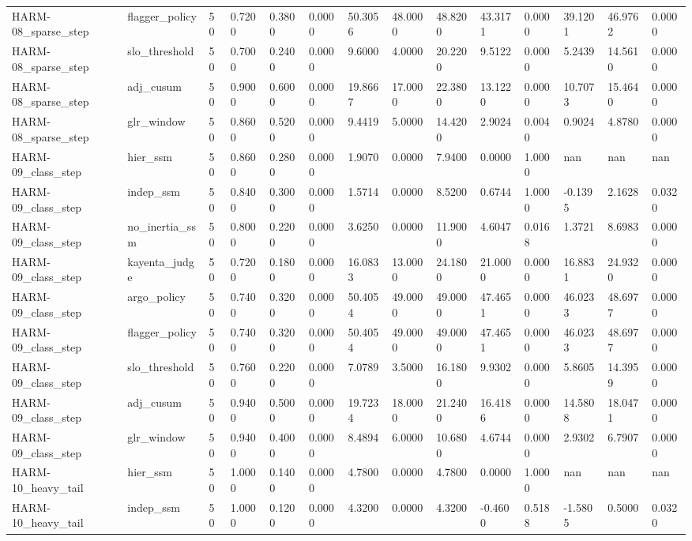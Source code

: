 \begin{table}[htbp]
\begin{tabular}{llllllllllllll}
HARM-08\_sparse\_step & flagger\_policy & 50 & 0.7200 & 0.3800 & 0.0000 & 50.3056 & 48.0000 & 48.8200 & 43.3171 & 0.0000 & 39.1201 & 46.9762 & 0.0000 \\
HARM-08\_sparse\_step & slo\_threshold & 50 & 0.7000 & 0.2400 & 0.0000 & 9.6000 & 4.0000 & 20.2200 & 9.5122 & 0.0000 & 5.2439 & 14.5610 & 0.0000 \\
HARM-08\_sparse\_step & adj\_cusum & 50 & 0.9000 & 0.6000 & 0.0000 & 19.8667 & 17.0000 & 22.3800 & 13.1220 & 0.0000 & 10.7073 & 15.4640 & 0.0000 \\
HARM-08\_sparse\_step & glr\_window & 50 & 0.8600 & 0.5200 & 0.0000 & 9.4419 & 5.0000 & 14.4200 & 2.9024 & 0.0040 & 0.9024 & 4.8780 & 0.0000 \\
HARM-09\_class\_step & hier\_ssm & 50 & 0.8600 & 0.2800 & 0.0000 & 1.9070 & 0.0000 & 7.9400 & 0.0000 & 1.0000 & nan & nan & nan \\
HARM-09\_class\_step & indep\_ssm & 50 & 0.8400 & 0.3000 & 0.0000 & 1.5714 & 0.0000 & 8.5200 & 0.6744 & 1.0000 & -0.1395 & 2.1628 & 0.0320 \\
HARM-09\_class\_step & no\_inertia\_ssm & 50 & 0.8000 & 0.2200 & 0.0000 & 3.6250 & 0.0000 & 11.9000 & 4.6047 & 0.0168 & 1.3721 & 8.6983 & 0.0000 \\
HARM-09\_class\_step & kayenta\_judge & 50 & 0.7200 & 0.1800 & 0.0000 & 16.0833 & 13.0000 & 24.1800 & 21.0000 & 0.0000 & 16.8831 & 24.9320 & 0.0000 \\
HARM-09\_class\_step & argo\_policy & 50 & 0.7400 & 0.3200 & 0.0000 & 50.4054 & 49.0000 & 49.0000 & 47.4651 & 0.0000 & 46.0233 & 48.6977 & 0.0000 \\
HARM-09\_class\_step & flagger\_policy & 50 & 0.7400 & 0.3200 & 0.0000 & 50.4054 & 49.0000 & 49.0000 & 47.4651 & 0.0000 & 46.0233 & 48.6977 & 0.0000 \\
HARM-09\_class\_step & slo\_threshold & 50 & 0.7600 & 0.2200 & 0.0000 & 7.0789 & 3.5000 & 16.1800 & 9.9302 & 0.0000 & 5.8605 & 14.3959 & 0.0000 \\
HARM-09\_class\_step & adj\_cusum & 50 & 0.9400 & 0.5000 & 0.0000 & 19.7234 & 18.0000 & 21.2400 & 16.4186 & 0.0000 & 14.5808 & 18.0471 & 0.0000 \\
HARM-09\_class\_step & glr\_window & 50 & 0.9400 & 0.4000 & 0.0000 & 8.4894 & 6.0000 & 10.6800 & 4.6744 & 0.0000 & 2.9302 & 6.7907 & 0.0000 \\
HARM-10\_heavy\_tail & hier\_ssm & 50 & 1.0000 & 0.1400 & 0.0000 & 4.7800 & 0.0000 & 4.7800 & 0.0000 & 1.0000 & nan & nan & nan \\
HARM-10\_heavy\_tail & indep\_ssm & 50 & 1.0000 & 0.1200 & 0.0000 & 4.3200 & 0.0000 & 4.3200 & -0.4600 & 0.5188 & -1.5805 & 0.5000 & 0.0320 \\

\end{tabular}
\end{table}
